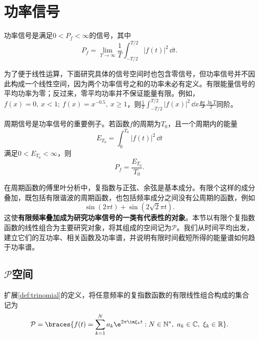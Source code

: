 \section{功率信号}\label{sec:Power_Signal}

功率信号是满足$0<P_f<\infty$的信号，其中
\begin{equation}
    P_f=\lim_{T\to\infty}\frac{1}{T}\int_{-T/2}^{T/2}|f(t)|^2\,\dd t.
\end{equation}

为了便于线性运算，下面研究具体的信号空间时也包含零信号，但功率信号并不因此构成一个线性空间，因为两个功率信号之和的功率未必有定义。有限能量信号的平均功率为零；反过来，零平均功率并不保证能量有限。例如，$f(x)=0,\ x<1;\ f(x)=x^{-0.5},\ x\ge 1$，则$\frac{1}{T}\int_{-T/2}^{T/2}|f(x)|^2\,\dd x$与$\frac{\ln T}{T}$同阶。

周期信号是功率信号的重要例子。若函数$f$的周期为$T_0$，且一个周期内的能量
\begin{equation}
    E_{T_0}=\int_0^{T_0}|f(t)|^2\,\dd t
\end{equation}
满足$0<E_{T_0}<\infty$，则
\begin{equation}
    P_f=\frac{E_{T_0}}{T_0}.
\end{equation}

在周期函数的傅里叶分析中，复指数与正弦、余弦是基本成分。有限个这样的成分叠加，既包括有限谐波的周期函数，也包括频率成分之间没有公周期的函数，例如
\begin{equation}
    \sin(2\pi t)+\sin(2\sqrt{2}\pi t).
\end{equation}
这使\textbf{有限频率叠加成为研究功率信号的一类有代表性的对象}。本节以有限个复指数函数的线性组合为主要研究对象，将其组成的空间记为$\mathcal{P}$。我们从时间平均出发，建立它们的互功率、相关函数及功率谱，并说明有限时间截短所得的能量谱如何趋于功率谱。

\subsection{\texorpdfstring{$\mathcal{P}$空间}{P空间}}\label{sub:power_signal}

\begin{definition}
    扩展\cref{def:trinomial}的定义，将任意频率的复指数函数的有限线性组合构成的集合记为
    \begin{equation}
        \mathcal{P}=\braces{
            f(t)=\sum_{k=1}^{N}a_k\e^{2\pi\im\xi_k t}:
            N\in\mathbb{N}^*,\ a_k\in\mathbb{C},\ \xi_k\in\mathbb{R}
        }.
    \end{equation}
\end{definition}

